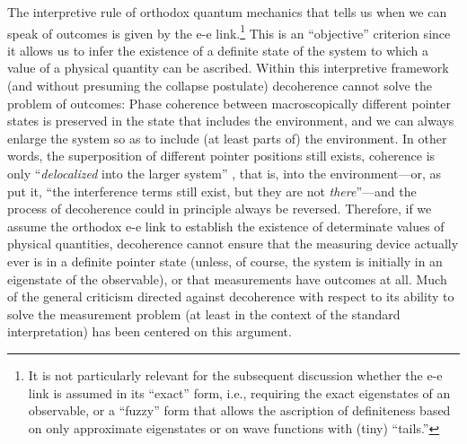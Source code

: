 \documentclass[twocolumn,rmp,aps,amsmath,amsfonts,noshowkeys,noshowpacs]{revtex4}
\begin{document}
The interpretive rule of orthodox quantum mechanics that tells us when
we can speak of outcomes is given by the {e-e} link.\footnote{It is
  not particularly relevant for the subsequent discussion whether the
  {e-e} link is assumed in its ``exact'' form, i.e., requiring the
  exact eigenstates of an observable, or a ``fuzzy'' form that allows
  the ascription of definiteness based on only approximate eigenstates
  or on wave functions with (tiny) ``tails.''}  This is an
``objective'' criterion since it allows us to infer the existence of a
definite state of the system to which a value of a physical quantity
can be ascribed. Within this interpretive framework (and without
presuming the collapse postulate) decoherence cannot solve the problem
of outcomes: Phase coherence between macroscopically different pointer
states is preserved in the state that includes the environment, and we
can always enlarge the system so as to include (at least parts of) the
environment. In other words, the superposition of different pointer
positions still exists, coherence is only ``\emph{delocalized} into
the larger system'' \citep[p.~5]{Kiefer:1998:rz}, that is, into the
environment---or, as \citet[p.~224]{Joos:1985:iu} put it, ``the
interference terms still exist, but they are not \emph{there}''---and
the process of decoherence could in principle always be reversed.
Therefore, if we assume the orthodox {e-e} link to establish the
existence of determinate values of physical quantities, decoherence
cannot ensure that the measuring device actually ever is in a definite
pointer state (unless, of course, the system is initially in an
eigenstate of the observable), or that measurements have outcomes at
all. Much of the general criticism directed against decoherence with
respect to its ability to solve the measurement problem (at least in
the context of the standard interpretation) has been centered on this
argument.
\end{document}
